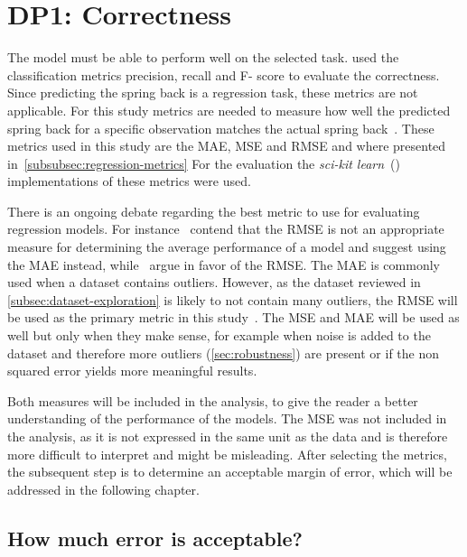 \section{DP1: Correctness}\label{sec:dp1:-correctness}

The model must be able to perform well on the selected task.
\cite{siebert2022construction} used the classification metrics precision, recall and F- score to evaluate the
correctness.
Since predicting the spring back is a regression task, these metrics are not applicable.
For this study metrics are needed to measure how well the predicted spring back for a specific observation
matches the actual spring back~\cite[p. 29]{hastie2009elements}.
These metrics used in this study are the MAE, MSE and RMSE and where presented in~\cref{subsubsec:regression-metrics}
For the evaluation the \textit{sci-kit learn}~(\cite{scikit-learn}) implementations of these metrics were used.

There is an ongoing debate regarding the best metric to use for evaluating regression models.
For instance~\cite{willmott2005advantages} contend that the RMSE is not an appropriate measure for determining the
average performance of a model and suggest using the MAE instead, while~\cite{chai2014root} argue in favor of the RMSE.
The MAE is commonly used when a dataset contains outliers.
However, as the dataset reviewed in \cref{subsec:dataset-exploration} is likely to not contain many outliers, the
RMSE will be used as the primary metric in this study~\cite[p. 1249]{chai2014root}.
The MSE and MAE will be used as well but only when they make sense, for example when noise is added to the dataset
and therefore more outliers (\cref{sec:robustness}) are present or if the non squared error yields more meaningful
results.

Both measures will be included in the analysis, to give the reader a better understanding of the performance of
the models.
The MSE was not included in the analysis, as it is not expressed in the same unit as the data and is therefore
more difficult to interpret and might be misleading.
After selecting the metrics, the subsequent step is to determine an acceptable margin of error, which will be
addressed in the following chapter.

\subsection*{How much error is acceptable?}\label{subsec:how-much-error-is-acceptable}

